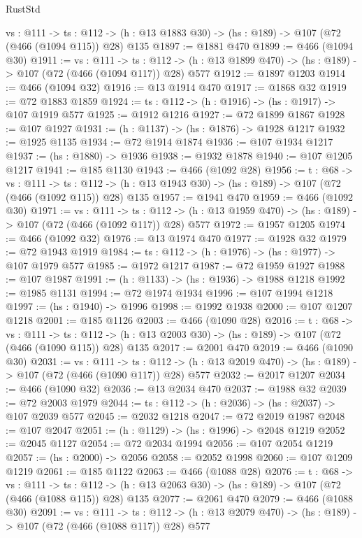 \begin{lexlean}{RustStd}
\begin{coremodule}
  {vs : @111} ->
  {ts : @112} -> (h : @13 @1883 @30) -> (hs : @189) -> @107 (@72 (@466 (@1094 @115)) @28) @135
@1897 := @1881 @470
@1899 := @466 (@1094 @30)
@1911 := {vs : @111} ->
  {ts : @112} -> (h : @13 @1899 @470) -> (hs : @189) -> @107 (@72 (@466 (@1094 @117)) @28) @577
@1912 := @1897 @1203
@1914 := @466 (@1094 @32)
@1916 := @13 @1914 @470
@1917 := @1868 @32
@1919 := @72 @1883 @1859
@1924 := {ts : @112} -> (h : @1916) -> (hs : @1917) -> @107 @1919 @577
@1925 := @1912 @1216
@1927 := @72 @1899 @1867
@1928 := @107 @1927
@1931 := (h : @1137) -> (hs : @1876) -> @1928 @1217
@1932 := @1925 @1135
@1934 := @72 @1914 @1874
@1936 := @107 @1934 @1217
@1937 := (hs : @1880) -> @1936
@1938 := @1932 @1878
@1940 := @107 @1205 @1217
@1941 := @185 @1130
@1943 := @466 (@1092 @28)
@1956 := {t : @68} ->
  {vs : @111} ->
  {ts : @112} -> (h : @13 @1943 @30) -> (hs : @189) -> @107 (@72 (@466 (@1092 @115)) @28) @135
@1957 := @1941 @470
@1959 := @466 (@1092 @30)
@1971 := {vs : @111} ->
  {ts : @112} -> (h : @13 @1959 @470) -> (hs : @189) -> @107 (@72 (@466 (@1092 @117)) @28) @577
@1972 := @1957 @1205
@1974 := @466 (@1092 @32)
@1976 := @13 @1974 @470
@1977 := @1928 @32
@1979 := @72 @1943 @1919
@1984 := {ts : @112} -> (h : @1976) -> (hs : @1977) -> @107 @1979 @577
@1985 := @1972 @1217
@1987 := @72 @1959 @1927
@1988 := @107 @1987
@1991 := (h : @1133) -> (hs : @1936) -> @1988 @1218
@1992 := @1985 @1131
@1994 := @72 @1974 @1934
@1996 := @107 @1994 @1218
@1997 := (hs : @1940) -> @1996
@1998 := @1992 @1938
@2000 := @107 @1207 @1218
@2001 := @185 @1126
@2003 := @466 (@1090 @28)
@2016 := {t : @68} ->
  {vs : @111} ->
  {ts : @112} -> (h : @13 @2003 @30) -> (hs : @189) -> @107 (@72 (@466 (@1090 @115)) @28) @135
@2017 := @2001 @470
@2019 := @466 (@1090 @30)
@2031 := {vs : @111} ->
  {ts : @112} -> (h : @13 @2019 @470) -> (hs : @189) -> @107 (@72 (@466 (@1090 @117)) @28) @577
@2032 := @2017 @1207
@2034 := @466 (@1090 @32)
@2036 := @13 @2034 @470
@2037 := @1988 @32
@2039 := @72 @2003 @1979
@2044 := {ts : @112} -> (h : @2036) -> (hs : @2037) -> @107 @2039 @577
@2045 := @2032 @1218
@2047 := @72 @2019 @1987
@2048 := @107 @2047
@2051 := (h : @1129) -> (hs : @1996) -> @2048 @1219
@2052 := @2045 @1127
@2054 := @72 @2034 @1994
@2056 := @107 @2054 @1219
@2057 := (hs : @2000) -> @2056
@2058 := @2052 @1998
@2060 := @107 @1209 @1219
@2061 := @185 @1122
@2063 := @466 (@1088 @28)
@2076 := {t : @68} ->
  {vs : @111} ->
  {ts : @112} -> (h : @13 @2063 @30) -> (hs : @189) -> @107 (@72 (@466 (@1088 @115)) @28) @135
@2077 := @2061 @470
@2079 := @466 (@1088 @30)
@2091 := {vs : @111} ->
  {ts : @112} -> (h : @13 @2079 @470) -> (hs : @189) -> @107 (@72 (@466 (@1088 @117)) @28) @577

\end{coremodule}
\end{lexlean}
